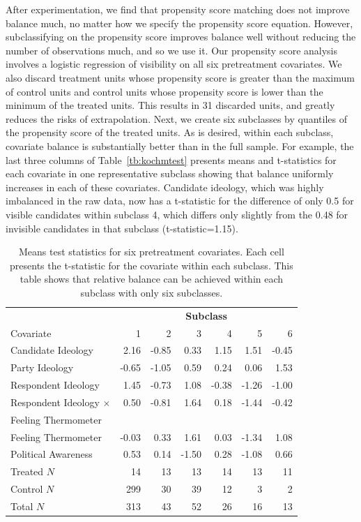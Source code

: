 \documentclass[11pt,titlepage]{article}
\newcommand{\MC}{\multicolumn}
\begin{document}
After experimentation, we find that propensity score matching does not
improve balance much, no matter how we specify the propensity score
equation.  However, subclassifying on the propensity score improves
balance well without reducing the number of observations much, and so
we use it.  Our propensity score analysis involves a logistic
regression of visibility on all six pretreatment covariates.  We also
discard treatment units whose propensity score is greater than the
maximum of control units and control units whose propensity score is
lower than the minimum of the treated units.  This results in 31
discarded units, and greatly reduces the risks of extrapolation.
Next, we create six subclasses by quantiles of the propensity score of
the treated units.  As is desired, within each subclass, covariate
balance is substantially better than in the full sample.  For example,
the last three columns of Table~\ref{tb:kochmtest} presents means and
t-statistics for each covariate in one representative subclass showing
that balance uniformly increases in each of these covariates.
Candidate ideology, which was highly imbalanced in the raw data, now
has a t-statistic for the difference of only 0.5 for visible
candidates within subclass 4, which differs only slightly from the
0.48 for invisible candidates in that subclass (t-statistic=1.15).

\begin{table}[t]
  \begin{center}
    \begin{tabular}{lrrrrrr}
      \hline
      & \MC{6}{c}{\bf Subclass} \\
      Covariate &  1 &  2 &  3 &  4 &  5 &  6 \\
      \hline
      Candidate Ideology & 2.16 & -0.85 & 0.33 & 1.15 & 1.51 & -0.45 \\
      Party Ideology & -0.65 & -1.05 & 0.59 & 0.24 & 0.06 & 1.53 \\
      Respondent Ideology & 1.45 & -0.73 & 1.08 & -0.38 & -1.26 & -1.00 \\
      Respondent Ideology $\times$ & 0.50 & -0.81 & 1.64 & 0.18 &
      -1.44 & -0.42 \\
      \hspace{0.1in} Feeling Thermometer \\
      Feeling Thermometer & -0.03 & 0.33 & 1.61 & 0.03 & -1.34 & 1.08 \\
      Political Awareness & 0.53 & 0.14 & -1.50 & 0.28 & -1.08 & 0.66
      \\ \hline
      Treated $N$& 14 & 13 & 13 & 14 & 13 & 11 \\
      Control $N$& 299 & 30 & 39 & 12 & 3 & 2 \\
      Total $N$  & 313 & 43 & 52 & 26 & 16 & 13 \\
      \hline
    \end{tabular}
    \caption{Means test statistics for six pretreatment covariates.
      Each cell presents the t-statistic for the covariate within each
      subclass.  This table shows that relative balance can be
      achieved within each subclass with only six subclasses.}
    \label{tb:kochxsub}
  \end{center}
\end{table}
\end{document}

